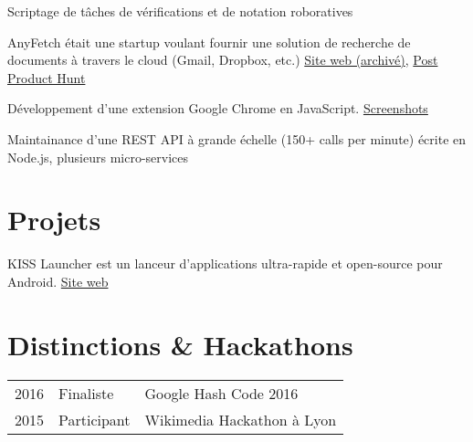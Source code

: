 \documentclass[]{resume-openfont}
\begin{document}
\begin{minipage}[t]{0.66\textwidth}
%
%
\vspace{\topsep}
\begin{tightemize}
\item Scriptage de tâches de vérifications et de notation roboratives
\end{tightemize}
\sectionsep

%
%
AnyFetch était une startup voulant fournir une solution de recherche de documents à travers le cloud (Gmail, Dropbox, etc.) \href{https://i.imgur.com/B3MMD6Y.png}{Site web (archivé)}, \href{https://www.producthunt.com/posts/anyfetch}{Post Product Hunt}
\vspace{\topsep}
\begin{tightemize}
\item Développement d'une extension Google Chrome en JavaScript. \href{https://i.imgur.com/yql5v1z.png}{Screenshots}
\item Maintainance d'une REST API à grande échelle (150+ calls per minute) écrite en Node.js, plusieurs micro-services
\end{tightemize}


\section{Projets}
%
%
KISS Launcher est un lanceur d'applications ultra-rapide et open-source pour Android. \href{http://kisslauncher.com/}{Site web}
\sectionsep


\section{Distinctions \& Hackathons}
\begin{tabular}{@{}rll}
2016       & Finaliste   & Google Hash Code 2016\\
2015       & Participant & Wikimedia Hackathon à Lyon
\end{tabular}
\sectionsep

\end{minipage}
\end{document}
